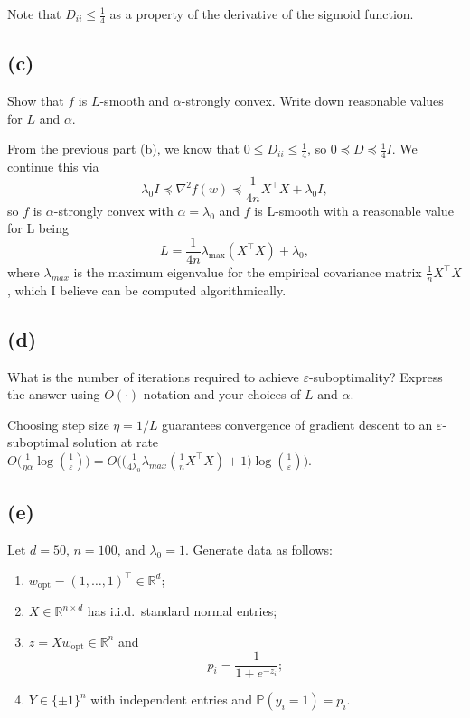 \documentclass[11pt]{article}
\begin{document}
Note that $D_{ii} \le \frac{1}{4}$ as a property of the derivative of the sigmoid function.

\hrulefill

\subsection*{(c)}
Show that $f$ is $L$-smooth and $\alpha$-strongly convex. Write down reasonable values for $L$ and $\alpha$.

\hrulefill

From the previous part (b), we know that $0 \le D_{ii} \le \frac{1}{4}$, so $0 \preceq D \preceq \frac{1}{4}I$. We continue this via
\[
\lambda_0 I \preceq \nabla^2 f(w) \preceq \frac{1}{4n} X^\top X + \lambda_0I,
\]
so $f$ is $\alpha$-strongly convex with $\alpha = \lambda_0$ and $f$ is L-smooth with a reasonable value for L being
\[
L = \frac{1}{4n}\lambda_{\max}(X^\top X) + \lambda_0,
\]
where $\lambda_{max}$ is the maximum eigenvalue for the empirical covariance matrix $\frac{1}{n}X^\top X$, which I believe can be computed algorithmically.

\hrulefill

\subsection*{(d)}

What is the number of iterations required to achieve $\varepsilon$-suboptimality? Express the answer using $O(\cdot)$ notation and your choices of $L$ and $\alpha$.

\hrulefill

Choosing step size $\eta = 1/L$ guarantees convergence of gradient descent to an $\varepsilon$-suboptimal solution at rate $O\big(\frac{1}{\eta \alpha} \log(\frac{1}{\varepsilon})\big) = O\bigg(\big(\frac{1}{4\lambda_0}\lambda_{max}(\frac{1}{n}X^\top X) + 1\big)\log(\frac{1}{\varepsilon})\bigg)$.

\subsection*{(e)}
Let $d = 50$, $n = 100$, and $\lambda_0 = 1$. Generate data as follows:
\begin{enumerate}
\item $w_{\text{opt}} = (1, \dots, 1)^\top \in \mathbb{R}^d$;
\item $X \in \mathbb{R}^{n \times d}$ has i.i.d.\ standard normal entries;
\item $z = X w_{\text{opt}} \in \mathbb{R}^n$ and
\[
p_i = \frac{1}{1 + e^{-z_i}};
\]
\item $Y \in \{\pm 1\}^n$ with independent entries and
$\mathbb{P}(y_i = 1) = p_i$.
\end{enumerate}
\end{document}
